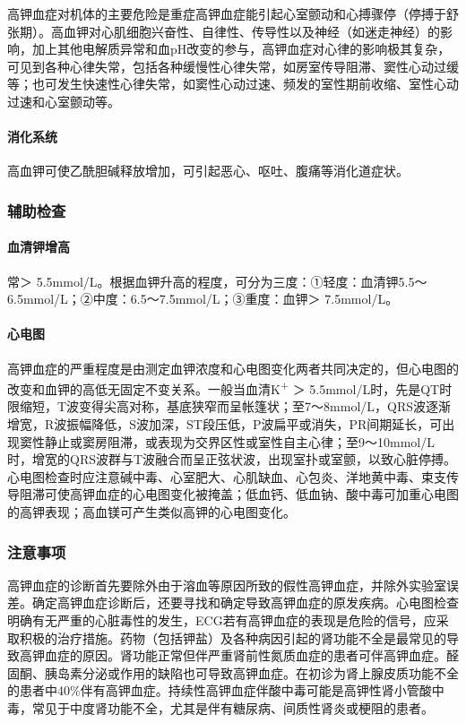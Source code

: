 高钾血症对机体的主要危险是重症高钾血症能引起心室颤动和心搏骤停（停搏于舒张期）。高血钾对心肌细胞兴奋性、自律性、传导性以及神经（如迷走神经）的影响，加上其他电解质异常和血pH改变的参与，高钾血症对心律的影响极其复杂，可见到各种心律失常，包括各种缓慢性心律失常，如房室传导阻滞、窦性心动过缓等；也可发生快速性心律失常，如窦性心动过速、频发的室性期前收缩、室性心动过速和心室颤动等。

\paragraph{消化系统}

高血钾可使乙酰胆碱释放增加，可引起恶心、呕吐、腹痛等消化道症状。

\subsubsection{辅助检查}

\paragraph{血清钾增高}

常＞
5.5mmol/L。根据血钾升高的程度，可分为三度：①轻度：血清钾5.5～6.5mmol/L；②中度：6.5～7.5mmol/L；③重度：血钾＞
7.5mmol/L。

\paragraph{心电图}

高钾血症的严重程度是由测定血钾浓度和心电图变化两者共同决定的，但心电图的改变和血钾的高低无固定不变关系。一般当血清K\textsuperscript{+}
＞
5.5mmol/L时，先是QT时限缩短，T波变得尖高对称，基底狭窄而呈帐篷状；至7～8mmol/L，QRS波逐渐增宽，R波振幅降低，S波加深，ST段压低，P波扁平或消失，PR间期延长，可出现窦性静止或窦房阻滞，或表现为交界区性或室性自主心律；至9～10mmol/L时，增宽的QRS波群与T波融合而呈正弦状波，出现室扑或室颤，以致心脏停搏。心电图检查时应注意碱中毒、心室肥大、心肌缺血、心包炎、洋地黄中毒、束支传导阻滞可使高钾血症的心电图变化被掩盖；低血钙、低血钠、酸中毒可加重心电图的高钾表现；高血镁可产生类似高钾的心电图变化。

\subsubsection{注意事项}

高钾血症的诊断首先要除外由于溶血等原因所致的假性高钾血症，并除外实验室误差。确定高钾血症诊断后，还要寻找和确定导致高钾血症的原发疾病。心电图检查明确有无严重的心脏毒性的发生，ECG若有高钾血症的表现是危险的信号，应采取积极的治疗措施。药物（包括钾盐）及各种病因引起的肾功能不全是最常见的导致高钾血症的原因。肾功能正常但伴严重肾前性氮质血症的患者可伴高钾血症。醛固酮、胰岛素分泌或作用的缺陷也可导致高钾血症。在初诊为肾上腺皮质功能不全的患者中40\%伴有高钾血症。持续性高钾血症伴酸中毒可能是高钾性肾小管酸中毒，常见于中度肾功能不全，尤其是伴有糖尿病、间质性肾炎或梗阻的患者。

